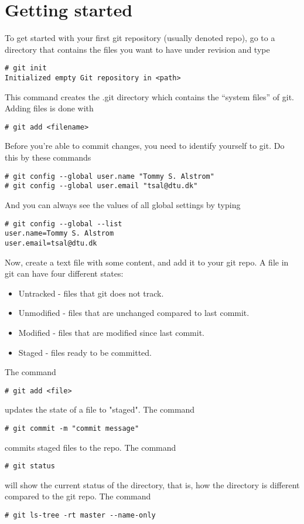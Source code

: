 \documentclass[10pt,a4paper]{article}
\begin{document}
\section{Getting started}
To get started with your first git repository (usually denoted repo), go to a directory that contains the files you want to have under revision and type
\begin{lstlisting}
# git init
Initialized empty Git repository in <path>
\end{lstlisting}
This command creates the .git directory which contains the ``system files'' of git.
Adding files is done with
\begin{lstlisting}
# git add <filename>
\end{lstlisting}
Before you're able to commit changes, you need to identify yourself to git. Do this by these commands
\begin{lstlisting}
# git config --global user.name "Tommy S. Alstrom"
# git config --global user.email "tsal@dtu.dk"
\end{lstlisting}
And you can always see the values of all global settings by typing
\begin{lstlisting}
# git config --global --list 
user.name=Tommy S. Alstrom
user.email=tsal@dtu.dk
\end{lstlisting}
Now, create a text file with some content, and add it to your git repo. A file in git can have four different states:
\begin{itemize}
\item Untracked - files that git does not track.
\item Unmodified - files that are unchanged compared to last commit.
\item Modified - files that are modified since last commit.
\item Staged - files ready to be committed.
\end{itemize}
The command
\begin{lstlisting}
# git add <file>
\end{lstlisting}
updates the state of a file to "staged". The command 
\begin{lstlisting}
# git commit -m "commit message"
\end{lstlisting}
commits staged files to the repo. The command 
\begin{lstlisting}
# git status
\end{lstlisting}
will show the current status of the directory, that is, how the directory is different compared to the git repo. The command 
\begin{lstlisting}
# git ls-tree -rt master --name-only
\end{lstlisting}
\end{document}
